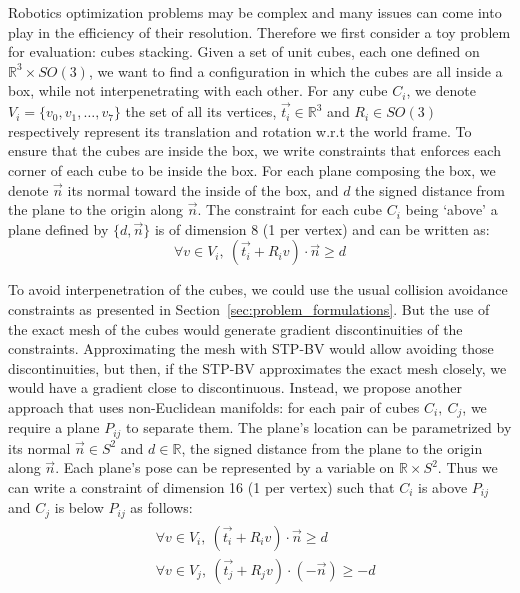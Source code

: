 Robotics optimization problems may be complex and many issues can come into play in the efficiency of their resolution.
Therefore we first consider a toy problem for evaluation: cubes stacking.
Given a set of unit cubes, each one defined on $\mathbb{R}^3 \times SO(3)$, we want to find a configuration in which the cubes are all inside a box, while not interpenetrating with each other.
For any cube $C_i$, we denote $V_i = \{v_0, v_1, \ldots, v_7\}$  the set of all its vertices, $\vec{t_i}\in\mathbb{R}^3$ and $R_i\in SO(3)$ respectively represent its translation and rotation w.r.t the world frame.
To ensure that the cubes are inside the box, we write constraints that enforces each corner of each cube to be inside the box.
For each plane composing the box, we denote $\vec{n}$ its normal toward the inside of the box, and $d$ the signed distance from the plane to the origin along $\vec{n}$.
The constraint for each cube $C_i$ being `above' a plane defined by $\{d, \vec{n}\}$ is of dimension 8 (1 per vertex) and can be written as:
\begin{equation}
  \forall v\in V_i,\ (\vec{t_i} + R_i v)\cdot \vec{n} \geq d
\end{equation}

To avoid interpenetration of the cubes, we could use the usual collision avoidance constraints as presented in Section~\ref{sec:problem_formulations}.
But the use of the exact mesh of the cubes would generate gradient discontinuities of the constraints.
Approximating the mesh with STP-BV would allow avoiding those discontinuities, but then, if the STP-BV approximates the exact mesh closely, we would have a gradient close to discontinuous.
Instead, we propose another approach that uses non-Euclidean manifolds: for each pair of cubes $C_i,\ C_j$, we require a plane $P_{ij}$ to separate them.
The plane's location can be parametrized by its normal $\vec{n}\in S^2$ and $d\in\mathbb{R}$, the signed distance from the plane to the origin along $\vec{n}$.
Each plane's pose can be represented by a variable on $\mathbb{R} \times S^2$.
Thus we can write a constraint of dimension 16 (1 per vertex) such that $C_i$ is above $P_{ij}$ and $C_j$ is below $P_{ij}$ as follows:
\begin{align}
  \begin{split}
    &\forall v\in V_i,\ (\vec{t_i} + R_i v)\cdot \vec{n} \geq d \\
    &\forall v\in V_j,\ (\vec{t_j} + R_j v)\cdot \left(-\vec{n}\right) \geq -d
  \end{split}
\end{align}


